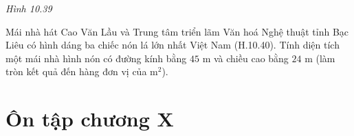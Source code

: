 \begin{exercises}
\begin{questions}[resume=SGK]
\begin{center}
            \textit{Hình 10.39}
        \end{center}
        \answerline
        \answerline

        \item Mái nhà hát Cao Văn Lầu và Trung tâm triển lãm Văn hoá Nghệ thuật tỉnh Bạc Liêu có hình dáng ba chiếc nón lá lớn nhất Việt Nam (H.10.40). Tính diện tích một mái nhà hình nón có đường kính bằng $45$ m và chiều cao bằng $24$ m (làm tròn kết quả đến hàng đơn vị của m$^2$).
        \answerline
        \answerline
    \end{questions}
\end{exercises}

\section*{Ôn tập chương X}

